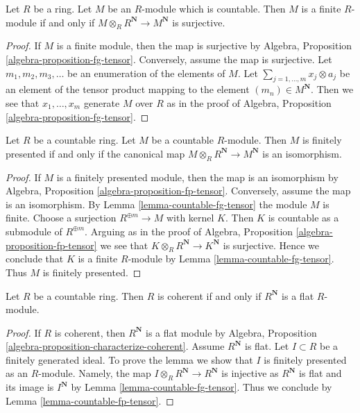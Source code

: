 \begin{lemma}
\label{lemma-countable-fg-tensor}
Let $R$ be a ring. Let $M$ be an $R$-module which is countable.
Then $M$ is a finite $R$-module if and only if
$M \otimes_R R^\mathbf{N} \to M^\mathbf{N}$ is surjective.
\end{lemma}

\begin{proof}
If $M$ is a finite module, then the map is surjective by Algebra, Proposition
\ref{algebra-proposition-fg-tensor}. Conversely, assume the map is surjective.
Let $m_1, m_2, m_3, \ldots$ be an enumeration of the elements of $M$.
Let $\sum_{j = 1, \ldots, m} x_j \otimes a_j$ be an element of the
tensor product mapping to the element $(m_n) \in M^\mathbf{N}$. Then
we see that $x_1, \ldots, x_m$ generate $M$ over $R$ as in the proof of
Algebra, Proposition \ref{algebra-proposition-fg-tensor}.
\end{proof}

\begin{lemma}
\label{lemma-countable-fp-tensor}
Let $R$ be a countable ring. Let $M$ be a countable $R$-module. Then $M$
is finitely presented if and only if the canonical map
$M \otimes_R R^\mathbf{N} \to M^\mathbf{N}$ is an isomorphism.
\end{lemma}

\begin{proof}
If $M$ is a finitely presented module, then the map is an isomorphism
by Algebra, Proposition \ref{algebra-proposition-fp-tensor}. Conversely,
assume the map is an isomorphism. By Lemma \ref{lemma-countable-fg-tensor}
the module $M$ is finite. Choose a surjection $R^{\oplus m} \to M$ with
kernel $K$. Then $K$ is countable as a submodule of $R^{\oplus m}$.
Arguing as in the proof of Algebra, Proposition
\ref{algebra-proposition-fp-tensor} we see that
$K \otimes_R R^\mathbf{N} \to K^\mathbf{N}$ is surjective.
Hence we conclude that $K$ is a finite $R$-module by
Lemma \ref{lemma-countable-fg-tensor}.
Thus $M$ is finitely presented.
\end{proof}

\begin{lemma}
\label{lemma-countable-coherent}
Let $R$ be a countable ring. Then $R$ is coherent if and only if
$R^\mathbf{N}$ is a flat $R$-module.
\end{lemma}

\begin{proof}
If $R$ is coherent, then $R^\mathbf{N}$ is a flat module by
Algebra, Proposition \ref{algebra-proposition-characterize-coherent}.
Assume $R^\mathbf{N}$ is flat. Let $I \subset R$ be a finitely
generated ideal. To prove the lemma we show that $I$ is finitely
presented as an $R$-module. Namely, the map
$I \otimes_R R^\mathbf{N} \to R^\mathbf{N}$ is
injective as $R^\mathbf{N}$ is flat and its image is
$I^\mathbf{N}$ by Lemma \ref{lemma-countable-fg-tensor}.
Thus we conclude by Lemma \ref{lemma-countable-fp-tensor}.
\end{proof}

